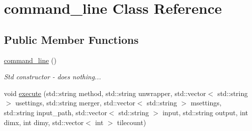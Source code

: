 \hypertarget{classcommand__line}{\section{command\-\_\-line Class Reference}
\label{classcommand__line}
}
\subsection*{Public Member Functions}
\begin{DoxyCompactItemize}
\item 
\hypertarget{classcommand__line_a164511e9c1edbbf25646a3c5c177813f}{\hyperlink{classcommand__line_a164511e9c1edbbf25646a3c5c177813f}{command\-\_\-line} ()}\label{classcommand__line_a164511e9c1edbbf25646a3c5c177813f}

\begin{DoxyCompactList}\small\item\em Std constructor -\/ does nothing... \end{DoxyCompactList}\item 
void \hyperlink{classcommand__line_a738a0e35cd1635340369d23a9094acea}{execute} (std\-::string method, std\-::string unwrapper, std\-::vector$<$ std\-::string $>$ usettings, std\-::string merger, std\-::vector$<$ std\-::string $>$ msettings, std\-::string input\-\_\-path, std\-::vector$<$ std\-::string $>$ input, std\-::string output, int dimx, int dimy, std\-::vector$<$ int $>$ tilecount)
\end{DoxyCompactItemize}


